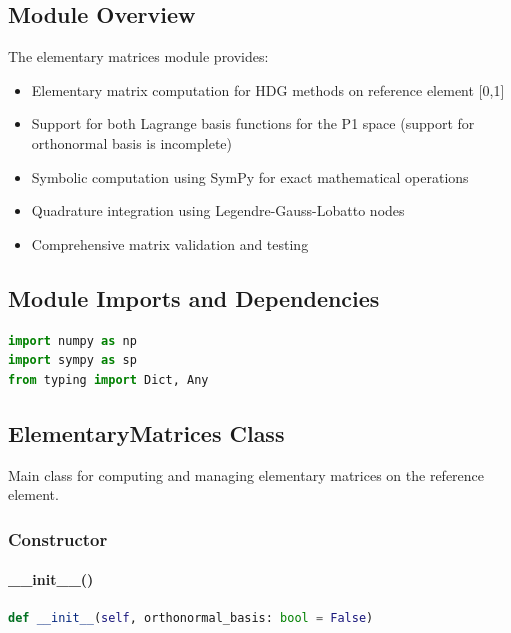 \subsection{Module Overview}

The elementary matrices module provides:
\begin{itemize}
    \item Elementary matrix computation for HDG methods on reference element [0,1]
    \item Support for both Lagrange basis functions for the P1 space (support for orthonormal basis is incomplete)
    \item Symbolic computation using SymPy for exact mathematical operations
    \item Quadrature integration using Legendre-Gauss-Lobatto nodes
    \item Comprehensive matrix validation and testing
\end{itemize}

\subsection{Module Imports and Dependencies}

\begin{lstlisting}[language=Python, caption=Module Dependencies]
import numpy as np
import sympy as sp
from typing import Dict, Any
\end{lstlisting}

\subsection{ElementaryMatrices Class}
\label{subsec:elementary_matrices_class}

Main class for computing and managing elementary matrices on the reference element.

\subsubsection{Constructor}

\paragraph{\_\_init\_\_()}\leavevmode
\begin{lstlisting}[language=Python, caption=ElementaryMatrices Constructor]
def __init__(self, orthonormal_basis: bool = False)
\end{lstlisting}

